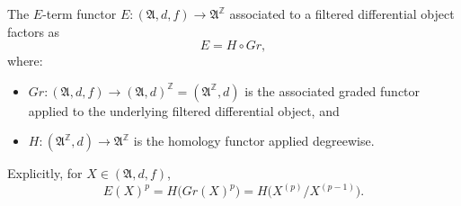 The $E$-term functor $E : (\mathfrak{A}, d, f) \to \mathfrak{A}^{\mathbb{Z}}$ associated to a filtered differential object factors as
$$
E = H \circ Gr,
$$
where:
\begin{itemize}
\item $Gr : (\mathfrak{A}, d, f) \to (\mathfrak{A}, d)^{\mathbb{Z}} = (\mathfrak{A}^{\mathbb{Z}}, d)$ is the associated graded functor applied to the underlying filtered differential object, and
\item $H : (\mathfrak{A}^{\mathbb{Z}}, d) \to \mathfrak{A}^{\mathbb{Z}}$ is the homology functor applied degreewise.
\end{itemize}
Explicitly, for $X \in (\mathfrak{A}, d, f)$,
$$
E(X)^p = H\bigl(Gr(X)^p\bigr) = H\bigl(X^{(p)} / X^{(p-1)}\bigr).
$$
